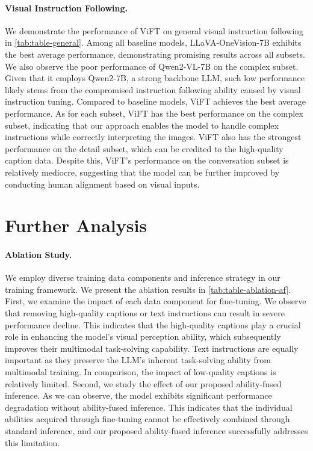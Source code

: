 \paragraph{Visual Instruction Following.} 
We demonstrate the performance of ViFT on general visual instruction following in \autoref{tab:table-general}. Among all baseline models, LLaVA-OneVision-7B exhibits the best average performance, demonstrating promising results across all subsets. We also observe the poor performance of Qwen2-VL-7B on the complex subset. Given that it employs Qwen2-7B, a strong backbone LLM, such low performance likely stems from the compromised instruction following ability caused by visual instruction tuning.
Compared to baseline models, ViFT achieves the best average performance. As for each subset, ViFT has the best performance on the complex subset, indicating that our approach enables the model to handle complex instructions while correctly interpreting the images. ViFT also has the strongest performance on the detail subset, which can be credited to the high-quality caption data. Despite this, ViFT's performance on the conversation subset is relatively mediocre, suggesting that the model can be further improved by conducting human alignment based on visual inputs.


\section{Further Analysis}\label{sec_anaysis}
\paragraph{Ablation Study.}

We employ diverse training data components and inference strategy in our training framework. We present the ablation results in \autoref{tab:table-ablation-af}.
First, we examine the impact of each data component for fine-tuning. We observe that removing high-quality captions or text instructions can result in severe performance decline. This indicates that the high-quality captions play a crucial role in enhancing the model's visual perception ability, which subsequently improves their multimodal task-solving capability. Text instructions are equally important as they preserve the LLM's inherent task-solving ability from multimodal training. In comparison, the impact of low-quality captions is relatively limited. Second, we study the effect of our proposed ability-fused inference. As we can observe, the model exhibits significant performance degradation without ability-fused inference.  This indicates that the individual abilities acquired through fine-tuning cannot be effectively combined through standard inference, and our proposed ability-fused inference successfully addresses this limitation.




